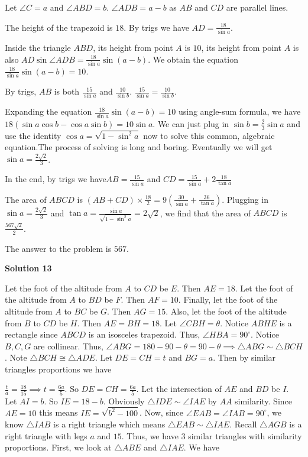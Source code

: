 \begin{enumerate}
 
Let $\angle C=a$ and $\angle ABD=b$. $\angle ADB=a-b$ as $AB$ and $CD$ are parallel lines.

 
The height of the trapezoid is $18$. By trigs we have $AD=\frac{18}{\sin{a}}$.

 
Inside the triangle $ABD$, its height from point $A$ is $10$, its height from point $A$ is also $AD \sin{\angle ADB}=\frac{18}{\sin{a}}\sin(a-b)$. We obtain the equation $\frac{18}{\sin{a}}\sin(a-b)=10$.

 
By trigs, $AB$ is both $\frac{15}{\sin{a}}$ and $\frac{10}{\sin{b}}$. $\frac{15}{\sin{a}} = \frac{10}{\sin{b}}$.

 
Expanding the equation $\frac{18}{\sin{a}}\sin(a-b)=10$ using angle-sum formula, we have $18(\sin{a}\cos{b}-\cos{a}\sin{b})=10\sin{a}$. We can just plug in $\sin{b}=\frac{2}{3}\sin{a}$ and use the identity $\cos{a}=\sqrt{1-\sin^2{a}}$ now to solve this common, algebraic equation.The process of solving is long and boring. Eventually we will get $\sin{a}=\frac{2\sqrt{2}}{3}$.

 
In the end, by trigs we have$AB=\frac{15}{\sin{a}}$             and             $CD=\frac{15}{\sin{a}}+2\frac{18}{\tan{a}}$

 
The area of $ABCD$ is $(AB+CD)\times \frac{18}{2} = 9(\frac{30}{\sin{a}}+\frac{36}{\tan{a}})$. Plugging in $\sin{a}=\frac{2\sqrt{2}}{3}$ and $\tan{a}=\frac{\sin{a}}{\sqrt{1-\sin^2{a}}}=2\sqrt{2}$, we find that the area of $ABCD$ is $\frac{567\sqrt{2}}{2}$.

 
The answer to the problem is $567$.

 



\textbf{Solution 13}

Let the foot of the altitude from $A$ to $CD$ be $E$. Then $AE = 18$. Let the foot of the altitude from $A$ to $BD$ be $F$. Then $AF = 10$. Finally, let the foot of the altitude from $A$ to $BC$ be $G$. Then $AG = 15$. Also, let the foot of the altitude from $B$ to $CD$ be $H$. Then $AE = BH = 18$. Let $\angle CBH = \theta$. Notice $ABHE$ is a rectangle since $ABCD$ is an isosceles trapezoid. Thus, $\angle HBA = 90^{\circ}$. Notice $B, C, G$ are collinear. Thus, $\angle ABG = 180 - 90 - \theta = 90 - \theta \implies \triangle ABG \sim \triangle BCH$. Note $\triangle BCH \cong \triangle ADE$. Let $DE = CH = t$ and $BG = a$. Then by similar triangles proportions we have

 $\frac{t}{a} = \frac{18}{15} \implies t = \frac{6a}{5}$. So $DE = CH= \frac{6a}{5}$. Let the intersection of $AE$ and $BD$ be $I$. Let $AI = b$. So $IE = 18 - b$. Obviously $\triangle IDE \sim \angle IAE$ by $AA$ similarity. Since $AE = 10$ this means $IE = \sqrt{b^2 - 100}$. Now, since $\angle EAB = \angle IAB = 90^{\circ}$, we know $\triangle IAB$ is a right triangle which means $\triangle EAB \sim \triangle IAE$. Recall $\triangle AGB$ is a right triangle with legs $a$ and $15$. Thus, we have $3$ similar triangles with similarity proportions. First, we look at $\triangle ABE$ and $\triangle IAE$. We have


\end{enumerate}

